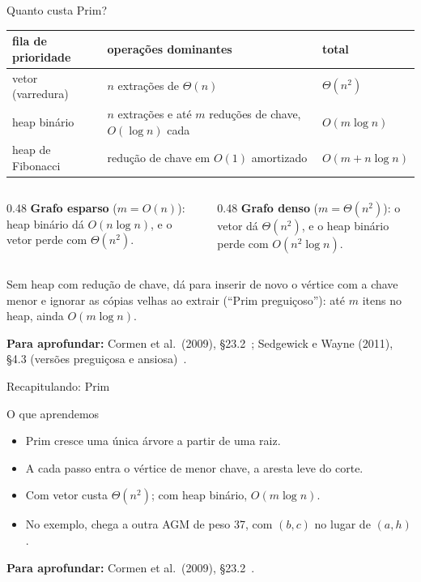 \documentclass[aspectratio=169,xcolor=table]{beamer}
\newcommand{\fonte}[1]{%
  \vfill
  {\tiny\color{gray!55!black}\textbf{Para aprofundar:} #1\par}%
}
\begin{document}
\begin{frame}{Quanto custa Prim?}
  \begin{center}
  \scriptsize
  \begin{tabular}{lll}
    \toprule
    fila de prioridade & operações dominantes & total \\
    \midrule
    vetor (varredura) & $n$ extrações de $\Theta(n)$ & $\Theta(n^2)$ \\
    heap binário & $n$ extrações e até $m$ reduções de chave, $O(\log n)$ cada & $O(m \log n)$ \\
    heap de Fibonacci & redução de chave em $O(1)$ amortizado & $O(m + n \log n)$ \\
    \bottomrule
  \end{tabular}
  \end{center}
  \medskip
  \begin{columns}[T]
    \begin{column}{0.48\textwidth}
      \scriptsize
      \textbf{Grafo esparso} ($m = O(n)$): heap binário dá $O(n \log n)$, e o vetor perde
      com $\Theta(n^2)$.
    \end{column}
    \begin{column}{0.48\textwidth}
      \scriptsize
      \textbf{Grafo denso} ($m = \Theta(n^2)$): o vetor dá $\Theta(n^2)$, e o heap binário
      perde com $O(n^2 \log n)$.
    \end{column}
  \end{columns}
  \medskip
  {\scriptsize Sem heap com redução de chave, dá para inserir de novo o vértice com a chave
  menor e ignorar as cópias velhas ao extrair (``Prim preguiçoso''): até $m$ itens no heap,
  ainda $O(m \log n)$.\par}
  \fonte{Cormen et al.\ (2009), \S 23.2~\cite{cormen2009introduction};
    Sedgewick e Wayne (2011), \S 4.3 (versões preguiçosa e ansiosa)~\cite{sedgewick2011algorithms}.}
\end{frame}

\begin{frame}{Recapitulando: Prim}
  \begin{block}{O que aprendemos}
    \begin{itemize}
      \item Prim cresce uma única árvore a partir de uma raiz.
      \item A cada passo entra o vértice de menor chave, a aresta leve do corte.
      \item Com vetor custa $\Theta(n^2)$; com heap binário, $O(m \log n)$.
      \item No exemplo, chega a outra AGM de peso 37, com $(b,c)$ no lugar de $(a,h)$.
    \end{itemize}
  \end{block}
  \fonte{Cormen et al.\ (2009), \S 23.2~\cite{cormen2009introduction}.}
\end{frame}
\end{document}
